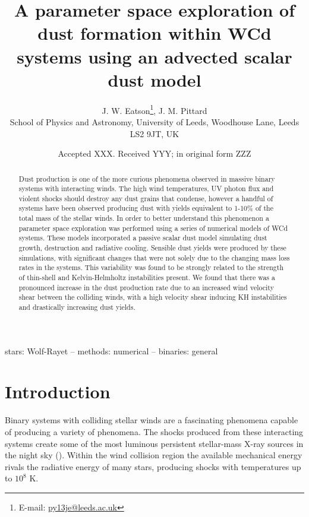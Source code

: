 \documentclass[fleqn,usenatbib]{mnras}
\title[Dust formation simulations in WCd systems]{A parameter space exploration of dust formation within WCd systems using an advected scalar dust model}
\author[J. W. Eatson et al.]{
J. W. Eatson\thanks{E-mail: \href{mailto:py13je@leeds.ac.uk}{py13je@leeds.ac.uk}},
J. M. Pittard
\\
School of Physics and Astronomy, University of
       Leeds, Woodhouse Lane, Leeds LS2 9JT, UK\\  
}
\date{Accepted XXX. Received YYY; in original form ZZZ}
\begin{document}
\label{firstpage}
\pagerange{\pageref{firstpage}--\pageref{lastpage}}
\maketitle

\begin{abstract}

Dust production is one of the more curious phenomena observed in massive binary systems with interacting winds.
The high wind temperatures, UV photon flux and violent shocks should destroy any dust grains that condense, however a handful of systems have been observed producing dust with yields equivalent to 1-10\% of the total mass of the stellar winds.
In order to better understand this phenomenon a parameter space exploration was performed using a series of numerical models of WCd systems.
These models incorporated a passive scalar dust model simulating dust growth, destruction and radiative cooling.
Sensible dust yields were produced by these simulations, with significant changes that were not solely due to the changing mass loss rates in the systems.
This variability was found to be strongly related to the strength of thin-shell and Kelvin-Helmholtz instabilities present.
We found that there was a pronounced increase in the dust production rate due to an increased wind velocity shear between the colliding winds, with a high velocity shear inducing KH instabilities and drastically increasing dust yields.

\end{abstract}

\begin{keywords}
stars: Wolf-Rayet -- methods: numerical -- binaries: general
\end{keywords}



\section{Introduction}

Binary systems with colliding stellar winds are a fascinating phenomena capable of producing a variety of phenomena.
The shocks produced from these interacting systems create some of the most luminous persistent stellar-mass X-ray sources in the night sky (\cite{rossloweSpatialDistributionGalactic2015}).
Within the wind collision region the available mechanical energy rivals the radiative energy of many stars, producing shocks with temperatures up to $10^8$ \si{\kelvin}.
\end{document}
